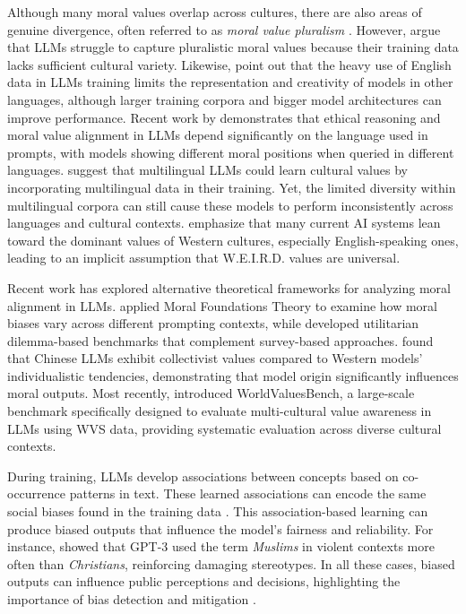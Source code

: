 \documentclass[a4paper,10pt,twoside]{article}
\begin{document}
Although many moral values overlap across cultures, there are also areas of genuine divergence, often referred to as \emph{moral value pluralism} \cite{Johnson2022,Benkler2023}. However,  argue that LLMs struggle to capture pluralistic moral values because their training data lacks sufficient cultural variety. Likewise,  point out that the heavy use of English data in LLMs training limits the representation and creativity of models in other languages, although larger training corpora and bigger model architectures can improve performance. Recent work by  demonstrates that ethical reasoning and moral value alignment in LLMs depend significantly on the language used in prompts, with models showing different moral positions when queried in different languages.  suggest that multilingual LLMs could learn cultural values by incorporating multilingual data in their training. Yet, the limited diversity within multilingual corpora can still cause these models to perform inconsistently across languages and cultural contexts.  emphasize that many current AI systems lean toward the dominant values of Western cultures, especially English-speaking ones, leading to an implicit assumption that W.E.I.R.D. values are universal.

Recent work has explored alternative theoretical frameworks for analyzing moral alignment in LLMs.  applied Moral Foundations Theory to examine how moral biases vary across different prompting contexts, while  developed utilitarian dilemma-based benchmarks that complement survey-based approaches.  found that Chinese LLMs exhibit collectivist values compared to Western models' individualistic tendencies, demonstrating that model origin significantly influences moral outputs. Most recently,  introduced WorldValuesBench, a large-scale benchmark specifically designed to evaluate multi-cultural value awareness in LLMs using WVS data, providing systematic evaluation across diverse cultural contexts.

During training, LLMs develop associations between concepts based on co-occurrence patterns in text. These learned associations can encode the same social biases found in the training data \cite{nemani2024gender,mohammadi2025explainability}. This association-based learning can produce biased outputs that influence the model's fairness and reliability. For instance,  showed that GPT-3 used the term \emph{Muslims} in violent contexts more often than \emph{Christians}, reinforcing damaging stereotypes. In all these cases, biased outputs can influence public perceptions and decisions, highlighting the importance of bias detection and mitigation \cite{Noble2018,Zou2018}.
\end{document}

